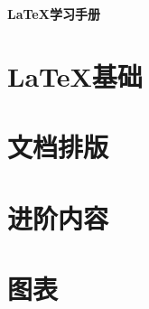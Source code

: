\documentclass{ctexart}
\begin{document}
\tableofcontents

\begin{center}    
    \LARGE
    \bfseries
    \LaTeX 学习手册
\end{center}


\section{\LaTeX 基础}











\section{文档排版}











\section{进阶内容}












\section{图表}











\end{document}
